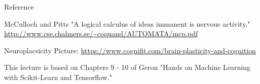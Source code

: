 \documentclass[10pt, table, dvipsnames,xcdraw, handout]{beamer}
\begin{document}
\begin{frame}[fragile]{Reference}
 
McCulloch and Pitts "A logical calculus of ideas immanent is nervous activity." \url{http://www.cse.chalmers.se/~coquand/AUTOMATA/mcp.pdf}

Neuroplacsicity Picture: \url{https://www.cognifit.com/brain-plasticity-and-cognition}

This lecture is based on Chapters 9 - 10 of Geron "Hands on Machine Learning with Scikit-Learn and Tensorflow."

\end{frame}
\end{document}
